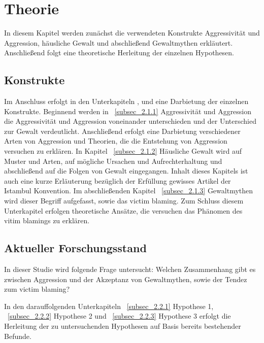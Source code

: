 

\chapter{Theorie}   \label{ch_2}
In diesem Kapitel werden zunächst die verwendeten Konstrukte Aggressivität und Aggression, häusliche Gewalt und abschließend Gewaltmythen erkläutert. Anschließend folgt eine theoretische Herleitung der einzelnen Hypothesen.

\section{Konstrukte}    \label{sec_2.1}
Im Anschluss erfolgt in den Unterkapiteln ,  und  eine Darbietung der einzelnen Konstrukte. Beginnend werden in ~\ref{subsec_2.1.1} Aggressivität und Aggression die Aggressivität und Aggression voneinander unterschieden und der Unterschied zur Gewalt verdeutlicht. Anschließend erfolgt eine Darbietung verschiedener Arten von Aggression und Theorien, die die Entstehung von Aggression versuchen zu erklären. In Kapitel ~\ref{subsec_2.1.2} Häusliche Gewalt wird auf Muster und Arten, auf mögliche Ursachen und Aufrechterhaltung und abschließend auf die Folgen von Gewalt eingegangen. Inhalt dieses Kapitels ist auch eine kurze Erläuterung bezüglich der Erfüllung gewisses Artikel der Istambul Konvention. Im abschließenden Kapitel ~\ref{subsec_2.1.3} Gewaltmythen wird dieser Begriff aufgefasst, sowie das victim blaming. Zum Schluss diesem Unterkapitel erfolgen theoretische Ansätze, die versuchen das Phänomen des vitim blamings zu erklären.





\section{Aktueller Forschungsstand}   \label{sec_2.2}
In dieser Studie wird folgende Frage untersucht: Welchen Zusammenhang gibt es zwischen Aggression und der Akzeptanz von Gewaltmythen, sowie der Tendez zum victim blaming? 

In den darauffolgenden Unterkapiteln ~\ref{subsec_2.2.1} Hypothese 1, ~\ref{subsec_2.2.2} Hypothese 2 und ~\ref{subsec_2.2.3} Hypothese 3 erfolgt die Herleitung der zu untersuchenden Hypothesen auf Basis bereits bestehender Befunde.



